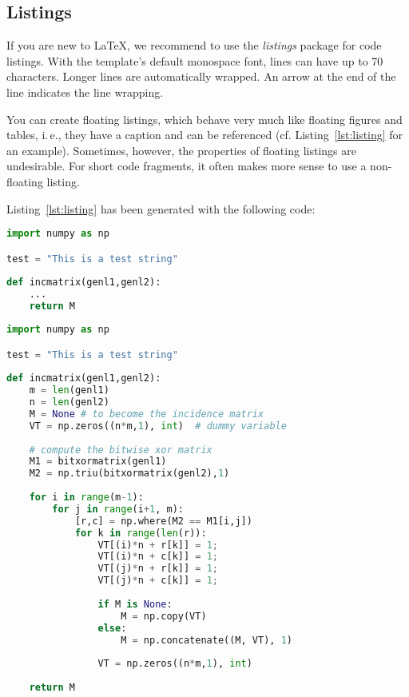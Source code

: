 \subsection{Listings}

If you are new to LaTeX, we recommend to use the \emph{listings} package for code listings.%
With the template's default monospace font, lines can have up to 70 characters. Longer lines are automatically wrapped. An arrow at the end of the line indicates the line wrapping.

You can create floating listings, which behave very much like floating figures and tables, i.\,e., they have a caption and can be referenced (cf. Listing~\ref{lst:listing} for an example). Sometimes, however, the properties of floating listings are undesirable. For short code fragments, it often makes more sense to use a non-floating listing.

Listing~\ref{lst:listing} has been generated with the following code:
\begin{latex}
\begin{lstlisting}[language=Python,float=t,
  caption={This is an example of syntax highlighting of
  Python code with a relatively long caption},label={lst:listing}]
import numpy as np

test = "This is a test string"
 
def incmatrix(genl1,genl2):
    ...
    return M
\end{lstlisting}
\end{latex}

\begin{lstlisting}[language=Python,float=t,
  caption={This is an example of syntax highlighting of
  Python code with a relatively long caption},label={lst:listing}]
import numpy as np

test = "This is a test string"
 
def incmatrix(genl1,genl2):
    m = len(genl1)
    n = len(genl2)
    M = None # to become the incidence matrix
    VT = np.zeros((n*m,1), int)  # dummy variable
 
    # compute the bitwise xor matrix
    M1 = bitxormatrix(genl1)
    M2 = np.triu(bitxormatrix(genl2),1) 
 
    for i in range(m-1):
        for j in range(i+1, m):
            [r,c] = np.where(M2 == M1[i,j])
            for k in range(len(r)):
                VT[(i)*n + r[k]] = 1;
                VT[(i)*n + c[k]] = 1;
                VT[(j)*n + r[k]] = 1;
                VT[(j)*n + c[k]] = 1;
 
                if M is None:
                    M = np.copy(VT)
                else:
                    M = np.concatenate((M, VT), 1)
 
                VT = np.zeros((n*m,1), int)
 
    return M
\end{lstlisting}


